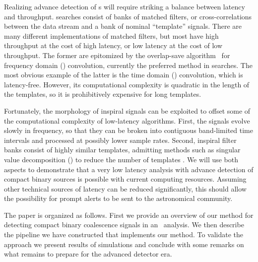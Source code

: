 Realizing advance detection of \CBC{}s will
require striking a balance between latency and throughput. \CBC{} searches
consist of banks of matched filters, or
cross-correlations between the data stream and a bank of nominal ``template''
signals.  There are many different implementations of matched filters, but most
have high throughput at the cost of high latency, or low latency at the cost of
low throughput.  The former are epitomized by the overlap-save algorithm~%
\citep{numerical-recipes-chapter-13} for frequency domain (\FD) convolution,
currently the preferred method in \GW{}
searches.  The most obvious example of the latter is the time domain
(\TD) convolution, which is latency-free.  However, its
computational complexity is quadratic in the length of the templates, so it is
prohibitively expensive for long templates.

Fortunately, the morphology of inspiral signals can be exploited to offset some
of the computational complexity of low-latency algorithms.  First, the signals
evolve slowly in frequency, so that they can be broken into contiguous
band-limited time intervals and processed at possibly lower sample rates.
Second, inspiral filter banks consist of highly similar templates, admitting
methods such as singular value decomposition (\SVD{}) to reduce the number of
templates \citep{Cannon:2010p10398}. We will use both aspects to demonstrate that a very
low latency analysis with advance detection of compact binary sources is
possible with current computing resources.  Assuming other technical sources of
latency can be reduced significantly, this should allow the possibility for
prompt alerts to be sent to the astronomical community.

The paper is organized as follows. First we provide an overview of our method
for detecting compact binary coalescence signals in an \earlywarning\ analysis.
We then describe the pipeline we have constructed that implements our method.
To validate the approach we present results of simulations and conclude with
some remarks on what remains to prepare for the advanced detector era.

